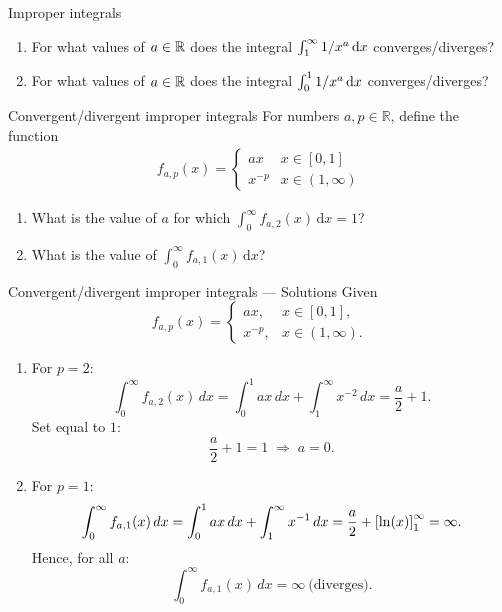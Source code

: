 \documentclass[9pt]{beamer}
\begin{document}
\begin{frame}{Improper integrals}

    \begin{enumerate}[leftmargin = 0.5cm, label = \arabic*., rightmargin = 0.2cm]
        \item For what values of $a\in \mathbb{R}$ does the integral $\int_1^\infty 1/x^a\,\mathrm{d} x$ converges/diverges?

        \item For what values of $a\in \mathbb{R}$ does the integral $\int_0^1 1/x^a\,\mathrm{d} x$ converges/diverges?
    \end{enumerate}
    
\end{frame}

\begin{frame}{Convergent/divergent improper integrals}
    For numbers $a, p \in\mathbb{R}$, define the function
    \begin{align*}
        f_{a,p}(x) =
        \begin{cases}
        ax & x\in [0, 1] \\
        x^{-p} & x\in(1,\infty)
        \end{cases}
    \end{align*}

    \begin{enumerate}[leftmargin = 0.5cm, label = (\alph*), rightmargin = 0.2cm]
        
        \item What is the value of $a$ for which $\int_0^\infty f_{a, 2}(x)\,\mathrm{d}x = 1$?

        \item What is the value of $\int_0^\infty f_{a, 1}(x)\,\mathrm{d}x$?
        
    \end{enumerate}
\end{frame}

\begin{frame}{Convergent/divergent improper integrals — Solutions}
    \small
    Given
    \[
    f_{a,p}(x)=
    \begin{cases}
    ax, & x\in[0,1],\\
    x^{-p}, & x\in(1,\infty).
    \end{cases}
    \]
    
    \begin{enumerate}[leftmargin=0.5cm,label=(\alph*),rightmargin=0.2cm]
    \item For $p=2$:
    \[
    \int_{0}^{\infty} f_{a,2}(x)\,dx=\int_{0}^{1} ax\,dx+\int_{1}^{\infty} x^{-2}\,dx
    =\frac{a}{2}+1.
    \]
    Set equal to $1$:
    \[
    \frac{a}{2}+1=1 \;\Rightarrow\; \boxed{a=0}.
    \]
    
    \item For $p=1$:
    \[
    \int_{0}^{\infty} f_{a,1}(x)\,dx=\int_{0}^{1} ax\,dx+\int_{1}^{\infty} x^{-1}\,dx
    =\frac{a}{2}+\left[\ln(x)\right]_1^\infty = \infty.
    \]
    Hence, for all $a$:
    \[
    \boxed{\int_{0}^{\infty} f_{a,1}(x)\,dx=\infty\ \text{(diverges)}}.
    \]
    \end{enumerate}
\end{frame}
    
\end{document}
